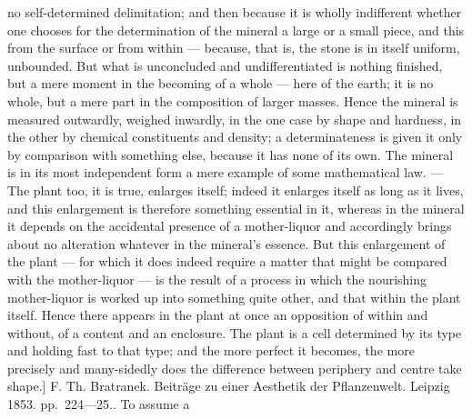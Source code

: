 \documentclass[12pt,a4paper]{book}
\begin{document}
{no self-determined delimitation; and then because it is wholly indifferent
whether one chooses for the determination of the mineral a large or a small
piece, and this from the surface or from within --- because, that is, the stone
is in itself uniform, unbounded. But what is unconcluded and undifferentiated
is nothing finished, but a mere moment in the becoming of a whole --- here of
the earth; it is no whole, but a mere part in the composition of larger masses.
Hence the mineral is measured outwardly, weighed inwardly, in the one case by
shape and hardness, in the other by chemical constituents and density; a
determinateness is given it only by comparison with something else, because it
has none of its own. The mineral is in its most independent form a mere example
of some mathematical law. --- The plant too, it is true, enlarges itself; indeed
it enlarges itself as long as it lives, and this enlargement is therefore
something essential in it, whereas in the mineral it depends on the accidental
presence of a mother-liquor and accordingly brings about no alteration whatever
in the mineral's essence. But this enlargement of the plant --- for which it
does indeed require a matter that might be compared with the mother-liquor ---
is the result of a process in which the nourishing mother-liquor is worked up
into something quite other, and that within the plant itself. Hence there
appears in the plant at once an opposition of within and without, of a content
and an enclosure. The plant is a cell determined by its type and holding fast
to that type; and the more perfect it becomes, the more precisely and
many-sidedly does the difference between periphery and centre take shape.]
F. Th. Bratranek. Beiträge zu einer Aesthetik der Pflanzenwelt. Leipzig 1853.
pp.~224---25.}. To assume a
\end{document}
